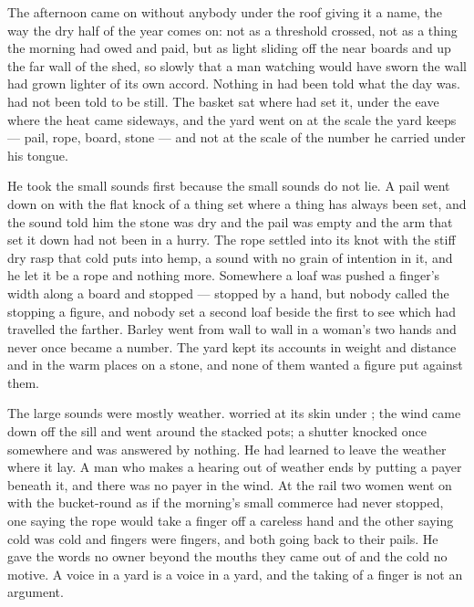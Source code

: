 The afternoon came on without anybody under the roof giving it a name, the way the dry half of the year comes on: not as a threshold crossed, not as a thing the morning had owed and paid, but as light sliding off the near boards and up the far wall of the shed, so slowly that a man watching would have sworn the wall had grown lighter of its own accord. Nothing in  had been told what the day was.  had not been told to be still. The basket sat where  had set it, under the eave where the heat came sideways, and the yard went on at the scale the yard keeps --- pail, rope, board, stone --- and not at the scale of the number he carried under his tongue.

He took the small sounds first because the small sounds do not lie. A pail went down on  with the flat knock of a thing set where a thing has always been set, and the sound told him the stone was dry and the pail was empty and the arm that set it down had not been in a hurry. The rope settled into its knot with the stiff dry rasp that cold puts into hemp, a sound with no grain of intention in it, and he let it be a rope and nothing more. Somewhere a loaf was pushed a finger's width along a board and stopped --- stopped by a hand, but nobody called the stopping a figure, and nobody set a second loaf beside the first to see which had travelled the farther. Barley went from wall to wall in a woman's two hands and never once became a number. The yard kept its accounts in weight and distance and in the warm places on a stone, and none of them wanted a figure put against them.

The large sounds were mostly weather.  worried at its skin under ; the wind came down off the sill and went around the stacked pots; a shutter knocked once somewhere and was answered by nothing. He had learned to leave the weather where it lay. A man who makes a hearing out of weather ends by putting a payer beneath it, and there was no payer in the wind. At the rail two women went on with the bucket-round as if the morning's small commerce had never stopped, one saying the rope would take a finger off a careless hand and the other saying cold was cold and fingers were fingers, and both going back to their pails. He gave the words no owner beyond the mouths they came out of and the cold no motive. A voice in a yard is a voice in a yard, and the taking of a finger is not an argument.

